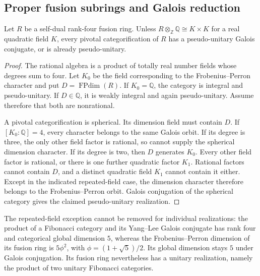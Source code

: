 \subsection{Proper fusion subrings and Galois reduction}

\begin{proposition}\label{prop:rank4-galois-exception}
Let $R$ be a self-dual rank-four fusion ring. Unless
$R\otimes_{\mathbb Z}\mathbb Q\cong K\times K$ for a real quadratic
field $K$, every pivotal categorification of $R$ has a pseudo-unitary
Galois conjugate, or is already pseudo-unitary.
\end{proposition}
\begin{proof}
The rational algebra is a product of totally real number fields whose
degrees sum to four. Let $K_0$ be the field corresponding to the
Frobenius--Perron character and put $D=\operatorname{FPdim}(R)$.
If $K_0=\mathbb Q$, the category is integral and pseudo-unitary. If
$D\in\mathbb Q$, it is weakly integral and again pseudo-unitary.
Assume therefore that both are nonrational.

A pivotal categorification is spherical. Its dimension field must contain
$D$. If $[K_0:\mathbb Q]=4$, every character belongs to the same Galois
orbit. If its degree is three, the only other field factor is rational,
so cannot supply the spherical dimension character. If its degree is
two, then $D$ generates $K_0$. Every other field factor is rational,
or there is one further quadratic factor $K_1$. Rational factors cannot
contain $D$, and a distinct quadratic field $K_1$ cannot contain it either.
Except in the indicated repeated-field case, the dimension character
therefore belongs to the Frobenius--Perron orbit. Galois conjugation of
the spherical category gives the claimed pseudo-unitary realization.
\end{proof}

The repeated-field exception cannot be removed for individual realizations:
the product of a Fibonacci category and its Yang--Lee Galois conjugate has
rank four and categorical global dimension $5$, whereas the Frobenius--Perron
dimension of its fusion ring is $5\phi^2$, with $\phi=(1+\sqrt5)/2$.
Its global dimension stays $5$ under Galois conjugation. Its fusion ring
nevertheless has a unitary realization, namely the product of two unitary
Fibonacci categories.

